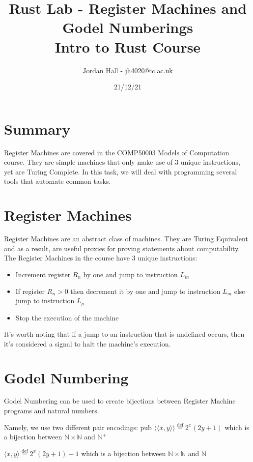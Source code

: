 \documentclass{report}
\title{%
    Rust Lab - Register Machines and Godel Numberings \\
    \large Intro to Rust Course
    }
\author{Jordan Hall - jh4020@ic.ac.uk}
\date{21/12/21}
\newcommand*{\defeq}{\stackrel{\text{def}}{=}}
\begin{document}
\maketitle

\section*{Summary}
Register Machines are covered in the COMP50003 Models of Computation course. 
They are simple machines that only make use of 3 unique instructions, yet are 
Turing Complete. In this task, we will deal with programming several tools that 
automate common tasks.

\section*{Register Machines}
Register Machines are an abstract class of machines. They are Turing Equivalent 
and as a result, are useful proxies for proving statements about computability.\\
The Register Machines in the course have 3 unique instructions:
\begin{itemize}
    \item { Increment register $R_n$ by one and jump to 
    instruction $L_m$}
    \item { If register $R_n>0$ then decrement it by one 
    and jump to instruction $L_m$ else jump to instruction $L_p$}
    \item { Stop the execution of the machine}
\end{itemize}
It’s worth noting that if a jump to an instruction that is undefined occurs, 
then it’s considered a signal to halt the machine’s execution.

\section*{Godel Numbering}
Godel Numbering can be used to create bijections between Register Machine programs 
and natural numbers.

Namely, we use two different pair encodings:
pub
$ \langle\langle x,y \rangle\rangle \defeq 2^x(2y+1) $ which is a bijection between $\mathbb{N} \times \mathbb{N}$ and $ \mathbb{N^+}$

$ \langle x,y \rangle \defeq 2^x(2y+1) - 1 $ which is a bijection between $\mathbb{N} \times \mathbb{N}$ and $ \mathbb{N}$\\
\end{document}
